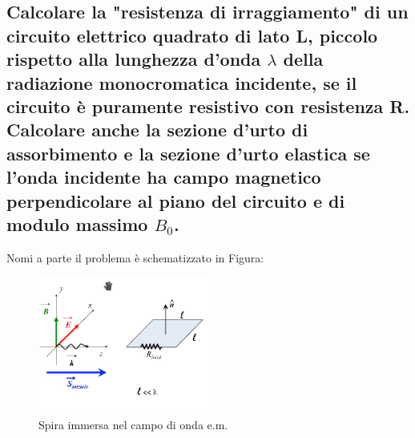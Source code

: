 \subsection[]{ Calcolare la "resistenza di irraggiamento" di un circuito elettrico quadrato di lato L, piccolo rispetto alla lunghezza d'onda $\lambda$ della radiazione monocromatica incidente, se il circuito è puramente resistivo con resistenza R.\\
Calcolare anche la sezione d'urto di assorbimento e la sezione d'urto elastica se l'onda incidente ha campo magnetico perpendicolare al piano del circuito e di modulo massimo $B_0$. }
Nomi a parte il problema è schematizzato in Figura:
\begin{figure}[H]
	\centering
	\includegraphics[width=0.5\textwidth]{immagini/spira_onda.png}
	\caption{Spira immersa nel campo di onda e.m.}
	\label{fig:spira1}
\end{figure}
